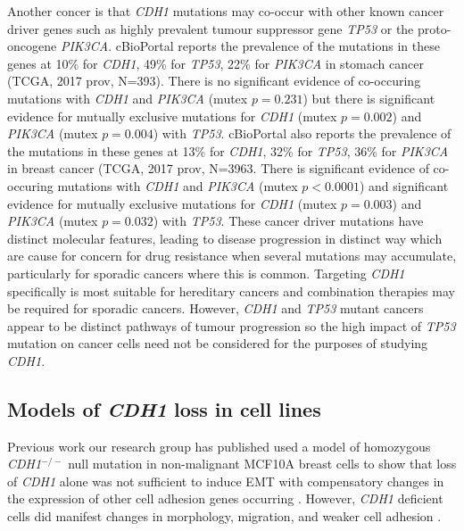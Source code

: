 Another concer is that \textit{CDH1} mutations may co-occur with other known cancer driver genes such as highly prevalent tumour suppressor gene \textit{TP53} or the proto-oncogene \textit{PIK3CA}. cBioPortal reports the prevalence of the mutations in these genes at 10\% for \textit{CDH1}, 49\% for \textit{TP53}, 22\% for \textit{PIK3CA} in stomach cancer (TCGA, 2017 prov, N=393). There is no significant evidence of co-occuring mutations with \textit{CDH1} and \textit{PIK3CA} (mutex $p=0.231$) but there is significant evidence for mutually exclusive mutations for \textit{CDH1} (mutex $p=0.002$) and \textit{PIK3CA} (mutex $p=0.004$) with \textit{TP53}. cBioPortal also reports the prevalence of the mutations in these genes at 13\% for \textit{CDH1}, 32\% for \textit{TP53}, 36\% for \textit{PIK3CA} in breast cancer (TCGA, 2017 prov, N=3963. There is significant evidence of co-occuring mutations with \textit{CDH1} and \textit{PIK3CA} (mutex $p<0.0001$) and significant evidence for mutually exclusive mutations for \textit{CDH1} (mutex $p=0.003$) and \textit{PIK3CA} (mutex $p=0.032$) with \textit{TP53}. These cancer driver mutations have distinct molecular features, leading to disease progression in distinct way which are cause for concern for drug resistance when several mutations may accumulate, particularly for sporadic cancers where this is common. Targeting \textit{CDH1} specifically is most suitable for hereditary cancers and combination therapies may be required for sporadic cancers. However, \textit{CDH1} and \textit{TP53} mutant cancers appear to be distinct pathways of tumour progression so the high impact of \textit{TP53} mutation on cancer cells need not be considered for the purposes of studying \textit{CDH1}.

\subsection{Models of \textit{CDH1} loss in cell lines}
Previous work our research group has published used a model of  homozygous \textit{CDH1}$^{-/-}$ null mutation in non-malignant MCF10A breast cells to show that loss of \textit{CDH1} alone was not sufficient to induce EMT with compensatory changes in the expression of other cell adhesion genes occurring \cite{Chen2014}. However, \textit{CDH1} deficient cells did manifest changes in morphology, migration, and weaker cell adhesion \cite{Chen2014}.


